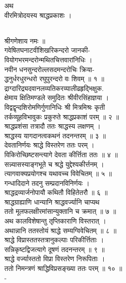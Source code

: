 \documentclass[11pt, openany]{book}
\begin{document}
{{{{{{{{{{{{{{ }{अथ\\
}{वीरमित्रोदयस्य श्राद्धप्रकाशः ।}{\\
\textbar{}\textbar{} श्रीगणेशाय नमः ॥\\
गवेषितघनाटवीशिखरिकन्दरो जानकी-\\
वियोगभरमन्दरोन्मथितचित्तवारांनिधिः ।\\
नवीन धनसुन्दरोल्लसदमन्दरोचिः क्रिया-\\
द्धनुर्धरधुरन्धरो रघुपुरन्दरो वः शिवम् ॥ १ ॥\\
द्राग्दारिद्र्यदवानलव्यतिकरव्यालीढहृद्भिक्षुक.\\
क्षेमाय क्षितिमण्डले समुदितः श्रीवीरसिंहाज्ञया ।\\
विद्वद्वृन्दशिरोमणिर्गुणानिधिः श्री मित्रमिश्रः कृती\\
तर्कव्यूहविभावुकः प्रकुरुते श्राद्धप्रकाशं परम् ॥ २ ॥\\
श्राद्धप्रशंसा तत्रादौ ततः श्राद्धस्य लक्षणम् ।\\
श्राद्धस्य यागदानत्वकथनं तदनन्तरम् ॥ ३ ॥\\
देवतानिर्णयः श्राद्धे विस्तरेण ततः परम् ।\\
विकिरोच्छिष्टसन्त्यागे देवता कीर्त्तिता ततः ॥ ४ ॥\\
सन्न्यासस्याङ्गभूते च श्रद्धे युद्देश्यकीर्त्तनम् ।\\
त्यागवाक्यप्रयोगश्च यथावच्च विवेचितम् ॥ ५ ॥\\
गन्धादिदाने तदनु सम्प्रदानविनिर्णयः ।\\
श्राद्धद्रव्यार्जनोपायौ कथितौ विहितेतरौ ॥ ६ ॥\\
श्राद्धग्राह्याणि धान्यानि श्राद्धवर्ज्यानि चाप्यथ \textbar{}\\
ततो मूलफलक्षीरमांसान्युक्तानि च क्रमात् ॥ ७ ॥\\
अथ कालविशेषान्तु तृप्तिकाराणि विस्तरात् ।\\
अथान्नानि ततस्तोयं श्राद्धे सम्यग्विवेचितम् ॥ ८ ॥\\
श्राद्धे विप्रास्ततस्तत्रानुकल्पाः परिकीर्त्तिताः ।\\
सन्निकृष्टद्विजत्यागे दूषणं तदनन्तरम् ॥ ९ ॥\\
श्राद्धे वर्ज्यास्ततो विप्रा विस्तरेण निरूपिताः ।\\
ततो निमन्त्रणं श्राद्धिविप्रसङ्ख्या ततः परम् ॥ १० ॥\\
-

}}}}}}}}}}}}}}
\end{document}
